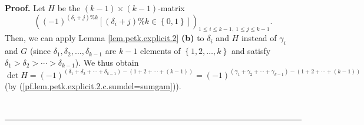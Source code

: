 \documentclass[numbers=enddot,12pt,final,onecolumn,notitlepage]{scrartcl}%
\theoremstyle{definition}
\newenvironment{proof}[1][Proof]{\noindent\textbf{#1.} }{\ \rule{0.5em}{0.5em}}
\begin{document}
\begin{proof}
Let $H$ be the $\left(  k-1\right)  \times\left(  k-1\right)  $-matrix%
\[
\left(  \left(  -1\right)  ^{\left(  \delta_{i}+j\right)  \%k}\left[  \left(
\delta_{i}+j\right)  \%k\in\left\{  0,1\right\}  \right]  \right)  _{1\leq
i\leq k-1,\ 1\leq j\leq k-1}.
\]
Then, we can apply Lemma \ref{lem.petk.explicit.2} \textbf{(b)} to $\delta
_{i}$ and $H$ instead of $\gamma_{i}$ and $G$ (since $\delta_{1},\delta
_{2},\ldots,\delta_{k-1}$ are $k-1$ elements of $\left\{  1,2,\ldots
,k\right\}  $ and satisfy $\delta_{1}>\delta_{2}>\cdots>\delta_{k-1}$). We
thus obtain%
\[
\det H=\left(  -1\right)  ^{\left(  \delta_{1}+\delta_{2}+\cdots+\delta
_{k-1}\right)  -\left(  1+2+\cdots+\left(  k-1\right)  \right)  }=\left(
-1\right)  ^{\left(  \gamma_{1}+\gamma_{2}+\cdots+\gamma_{k-1}\right)
-\left(  1+2+\cdots+\left(  k-1\right)  \right)  }%
\]
(by (\ref{pf.lem.petk.explicit.2.c.sumdel=sumgam})).


\end{proof}
\end{document}

